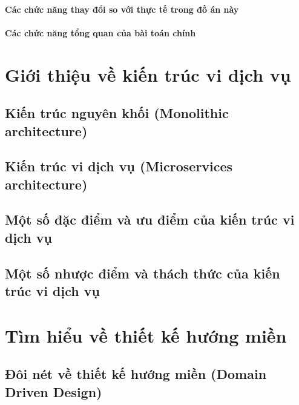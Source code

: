 \documentclass{report} %
\begin{document}
\subsubsection{Các chức năng thay đổi so với thực tế trong đồ án này}

\subsubsection{Các chức năng tổng quan của bài toán chính}


\chapter{Giới thiệu về kiến trúc vi dịch vụ}

\section{Kiến trúc nguyên khối (Monolithic architecture)}

\section{Kiến trúc vi dịch vụ (Microservices architecture)}

\section{Một số đặc điểm và ưu điểm của kiến trúc vi dịch vụ}

\section{Một số nhược điểm và thách thức của kiến trúc vi dịch vụ}


\chapter{Tìm hiểu về thiết kế hướng miền}


\section{Đôi nét về thiết kế hướng miền (Domain Driven Design)}

\end{document}
